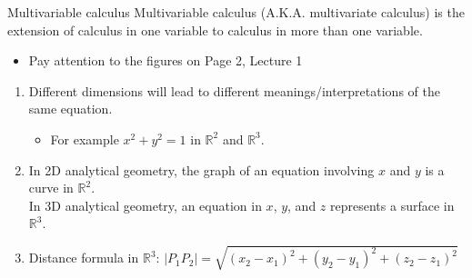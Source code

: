 \documentclass{beamer}
\begin{document}
\begin{frame}[allowframebreaks]{Multivariable calculus}
	Multivariable calculus (A.K.A. multivariate calculus) is the extension of calculus
	in one variable to calculus in more than one variable.
	\begin{itemize}
		\item Pay attention to the figures on Page 2, Lecture 1
	\end{itemize}
	\begin{enumerate}
		\item Different \alert{dimensions} will lead to different meanings/interpretations of the \alert{same} equation.
		\begin{itemize}
			\item For example $x^2 + y^2 = 1$ in $\mathbb{R}^2$ and $\mathbb{R}^3$.
		\end{itemize}
		
		\item In 2D analytical geometry, the graph of an equation involving $x$ and $y$ is a \alert{curve} in $\mathbb{R}^2$. \\In 3D analytical geometry, an equation in $x$, $y$, and $z$ represents a \alert{surface} in $\mathbb{R}^3$.
		
		\item Distance formula in $\mathbb{R}^3$: $|P_1P_2| = \sqrt{(x_2 - x_1)^2 + (y_2 - y_1)^2 + (z_2-z_1)^2}$
	\end{enumerate}
	
	
\end{frame}
\end{document}
